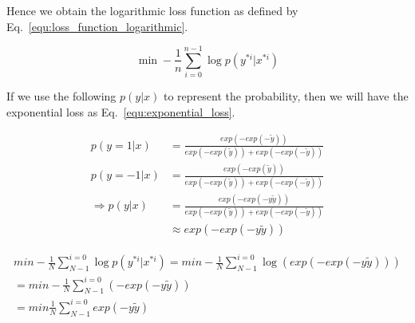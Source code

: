 \documentclass[runningheads,openany]{xhlPaper}
\begin{document}
Hence we obtain the logarithmic loss function as defined by Eq.~\ref{equ:loss_function_logarithmic}.

\begin{equation}
\label{equ:loss_function_logarithmic}
\min  - \frac{1}{n}\sum\limits_{i = 0}^{n - 1} {\log p\left( {{y^{*i}}|{x^{*i}}} \right)} 
\end{equation}

If we use the following $p\left ( y|x \right )$ to represent the probability, then we will have the exponential loss as Eq.~\ref{equ:exponential_loss}.

\begin{displaymath}
\begin{aligned}
p\left ( y=1|x \right )&=\frac{exp\left ( -exp\left ( -\tilde{y} \right ) \right )}{exp\left ( -exp\left ( \tilde{y} \right ) \right ) + exp\left ( -exp\left ( -\tilde{y} \right ) \right )}\\
p\left ( y=-1|x \right )&=\frac{exp\left ( -exp\left ( \tilde{y} \right ) \right )}{exp\left ( -exp\left ( \tilde{y} \right ) \right ) + exp\left ( -exp\left ( -\tilde{y} \right ) \right )}\\
\Rightarrow p\left ( y|x \right )&=\frac{exp\left ( -exp\left ( -y\tilde{y} \right ) \right )}{exp\left ( -exp\left ( \tilde{y} \right ) \right ) + exp\left ( -exp\left ( -\tilde{y} \right ) \right )}\\
&\approx exp\left ( -exp\left ( -y\tilde{y} \right ) \right )
\end{aligned}
\end{displaymath}

\begin{equation}
\label{equ:exponential_loss}
\begin{aligned}
min -\frac{1}{N}\sum_{N-1}^{i = 0}\log p\left ( y^{*i} | x^{*i} \right )=min -\frac{1}{N}\sum_{N-1}^{i = 0}\log \left ( exp\left ( -exp\left ( -y\tilde{y} \right ) \right ) \right )\\
=min -\frac{1}{N}\sum_{N-1}^{i = 0}\left ( -exp\left ( -y\tilde{y} \right ) \right )\\
=min \frac{1}{N}\sum_{N-1}^{i = 0}exp\left ( -y\tilde{y} \right )
\end{aligned}
\end{equation}
\end{document}
